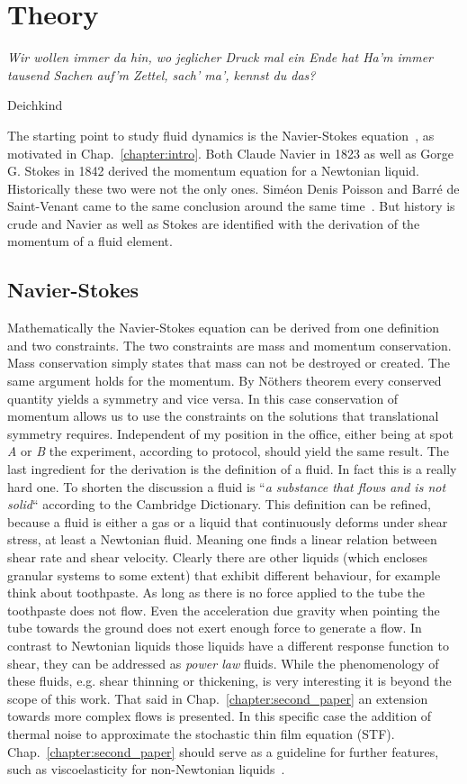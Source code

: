 \chapter{Theory}
\label{chapter:theory}
\epigraph{\textit{Wir wollen immer da hin, wo jeglicher Druck mal ein Ende hat
Ha'm immer tausend Sachen auf'm Zettel, sach' ma', kennst du das?}}{Deichkind}

The starting point to study fluid dynamics is the Navier-Stokes equation~\cite{Navier, Stokes}, as motivated in Chap.~\ref{chapter:intro}.
Both Claude Navier in 1823 as well as Gorge G. Stokes in 1842 derived the momentum equation for a Newtonian liquid.
Historically these two were not the only ones. 
Siméon Denis Poisson and Barré de Saint-Venant came to the same conclusion around the same time~\cite{https://doi.org/10.1002/andp.18321010607, de1843notea, anderson_jr_1997}.
But history is crude and Navier as well as Stokes are identified with the derivation of the momentum of a fluid element. 

\section{Navier-Stokes}
\label{sec:navier_stokes_sec}
Mathematically the Navier-Stokes equation can be derived from one definition and two constraints.
The two constraints are mass and momentum conservation.
Mass conservation simply states that mass can not be destroyed or created.
The same argument holds for the momentum.
By Nöthers theorem every conserved quantity yields a symmetry and vice versa.
In this case conservation of momentum allows us to use the constraints on the solutions that translational symmetry requires.
Independent of my position in the office, either being at spot \textit{A} or \textit{B} the experiment, according to protocol, should yield the same result.
The last ingredient for the derivation is the definition of a fluid.
In fact this is a really hard one. 
To shorten the discussion a fluid is ``\textit{a substance that flows and is not solid}`` according to the Cambridge Dictionary.
This definition can be refined, because a fluid is either a gas or a liquid that continuously deforms under shear stress, at least a Newtonian fluid.
Meaning one finds a linear relation between shear rate and shear velocity.
Clearly there are other liquids (which encloses granular systems to some extent) that exhibit different behaviour, for example think about toothpaste.
As long as there is no force applied to the tube the toothpaste does not flow.
Even the acceleration due gravity when pointing the tube towards the ground does not exert enough force to generate a flow.
In contrast to Newtonian liquids those liquids have a different response function to shear, they can be addressed as \textit{power law} fluids.
While the phenomenology of these fluids, e.g. shear thinning or thickening, is very interesting it is beyond the scope of this work. 
That said in Chap.~\ref{chapter:second_paper} an extension towards more complex flows is presented. 
In this specific case the addition of thermal noise to approximate the stochastic thin film equation (STF).
Chap.~\ref{chapter:second_paper} should serve as a guideline for further features, such as viscoelasticity for non-Newtonian liquids~\cite{doi:10.1142/S0218202513500140}. 

